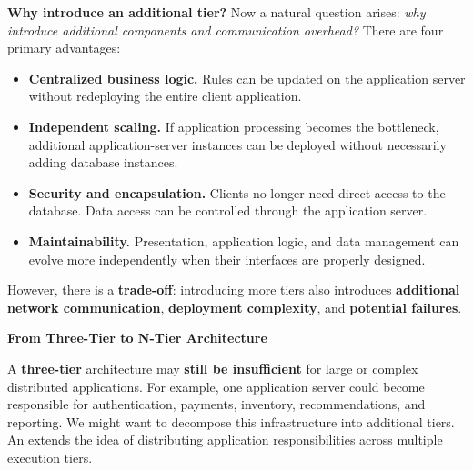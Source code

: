 \noindent
\textcolor{Green3}{ \textbf{Why introduce an additional tier?}} Now a natural question arises: \emph{why introduce additional components and communication overhead?} There are four primary advantages:
\begin{itemize}
    \item[\textcolor{Green3}{\faIcon{check}}] \textbf{Centralized business logic.} Rules can be updated on the application server without redeploying the entire client application.
    \item[\textcolor{Green3}{\faIcon{check}}] \textbf{Independent scaling.} If application processing becomes the bottleneck, additional application-server instances can be deployed without necessarily adding database instances.
    \item[\textcolor{Green3}{\faIcon{check}}] \textbf{Security and encapsulation.} Clients no longer need direct access to the database. Data access can be controlled through the application server.
    \item[\textcolor{Green3}{\faIcon{check}}] \textbf{Maintainability.} Presentation, application logic, and data management can evolve more independently when their interfaces are properly designed.
\end{itemize}
\textcolor{Red2}{} However, there is a \textbf{trade-off}: introducing more tiers also introduces \textbf{additional network communication}, \textbf{deployment complexity}, and \textbf{potential failures}.

\highspace
\begin{flushleft}
    \textcolor{Green3}{ \textbf{From Three-Tier to N-Tier Architecture}}
\end{flushleft}
A \textbf{three-tier} architecture may \textbf{still be insufficient} for large or complex distributed applications. For example, one application server could become responsible for authentication, payments, inventory, recommendations, and reporting. We might want to decompose this infrastructure into additional tiers. An  extends the idea of distributing application responsibilities across multiple execution tiers.


